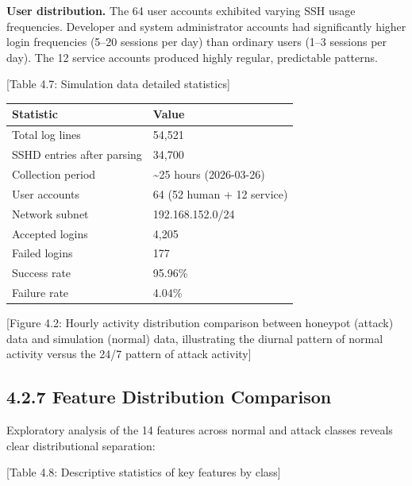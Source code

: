 \documentclass[
  a4paper]{report}
\newcounter{none} %
\begin{document}
\textbf{User distribution.} The 64 user accounts exhibited varying SSH
usage frequencies. Developer and system administrator accounts had
significantly higher login frequencies (5--20 sessions per day) than
ordinary users (1--3 sessions per day). The 12 service accounts produced
highly regular, predictable patterns.

{[}Table 4.7: Simulation data detailed statistics{]}

{\def\LTcaptype{none} %
\begin{longtable}[]{@{}ll@{}}
\toprule\noalign{}
Statistic & Value \\
\midrule\noalign{}
\endhead
\bottomrule\noalign{}
\endlastfoot
Total log lines & 54,521 \\
SSHD entries after parsing & 34,700 \\
Collection period & \textasciitilde25 hours (2026-03-26) \\
User accounts & 64 (52 human + 12 service) \\
Network subnet & 192.168.152.0/24 \\
Accepted logins & 4,205 \\
Failed logins & 177 \\
Success rate & 95.96\% \\
Failure rate & 4.04\% \\
\end{longtable}
}

{[}Figure 4.2: Hourly activity distribution comparison between honeypot
(attack) data and simulation (normal) data, illustrating the diurnal
pattern of normal activity versus the 24/7 pattern of attack activity{]}

\subsection{4.2.7 Feature Distribution
Comparison}\label{feature-distribution-comparison}

Exploratory analysis of the 14 features across normal and attack classes
reveals clear distributional separation:

{[}Table 4.8: Descriptive statistics of key features by class{]}
\end{document}

